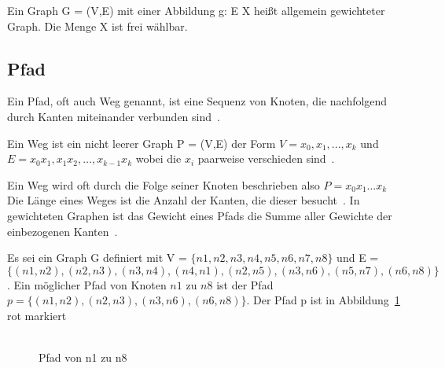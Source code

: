 \begin{definition}
    Ein Graph G = (V,E) mit einer Abbildung g: E \textrightarrow X heißt allgemein gewichteter Graph.
    Die Menge X ist frei wählbar.
    \label{allgemeingewichtetergraph}
\end{definition}

\subsection{Pfad}

Ein Pfad, oft auch Weg genannt, ist eine Sequenz von Knoten, die nachfolgend durch Kanten miteinander verbunden sind~\cite[vgl. S. 7 0.3]{graphentheorie}.

\begin{definition}
    Ein Weg ist ein nicht leerer Graph P = (V,E) der Form $V = {x_{0}, x_{1}, ..., x_{k}}$ und $E = {x_{0}x_{1}, x_{1}x_{2}, \ldots, x_{k-1}x_{k}}$ wobei die $x_{i}$
    paarweise verschieden sind~\cite[vgl. S. 7]{graphentheorie}.
\end{definition}

Ein Weg wird oft durch die Folge seiner Knoten beschrieben also $P=x_{0} x_{1} \ldots x_{k}$ \cite[vgl. S.7]{graphentheorie}
Die Länge eines Weges ist die Anzahl der Kanten, die dieser besucht~\cite[vgl. S. 7]{graphentheorie}.
In gewichteten Graphen ist das Gewicht eines Pfads die Summe aller Gewichte der einbezogenen Kanten~\cite[vgl. 7.2 kürzeste Wege]{graphentheorie3}.

\begin{example}
    Es sei ein Graph G definiert mit V = $\{n1,n2,n3,n4,n5,n6,n7,n8\}$ und E = $\{(n1,n2),(n2,n3),(n3,n4),(n4,n1),(n2,n5),(n3,n6),(n5,n7),(n6,n8)\}$.
    Ein möglicher Pfad von Knoten $n1$ zu $n8$ ist der Pfad $p = \{(n1, n2), (n2, n3), (n3, n6), (n6, n8)\}$.
    Der Pfad p ist in Abbildung~\ref{pfadbsp} rot markiert \\ \\
\end{example}

\begin{figure}[H]
    \begin{center}
    \end{center}
    \caption{Pfad von n1 zu n8}
    \label{pfadbsp}
\end{figure}

